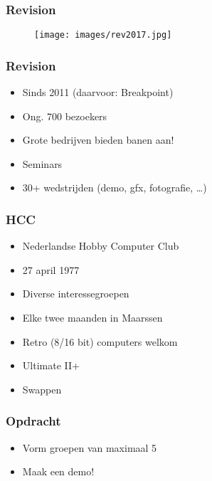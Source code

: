 \documentclass[aspectratio=43]{uva-inf-presentation}
\begin{document}
\begin{frame}
\frametitle{Revision}

\begin{figure}
\texttt{[image: images/rev2017.jpg]}
\end{figure}

\end{frame}


\begin{frame}
\frametitle{Revision}

\begin{itemize}
\item Sinds 2011 (daarvoor: Breakpoint)
\item Ong. 700 bezoekers
\item Grote bedrijven bieden banen aan!
\item Seminars
\item 30+ wedstrijden (demo, gfx, fotografie, \dots)
\end{itemize}

\end{frame}


\begin{frame}
\frametitle{HCC}

\begin{itemize}
\item Nederlandse Hobby Computer Club
\item 27 april 1977
\item Diverse interessegroepen
\item Elke twee maanden in Maarssen
\item Retro (8/16 bit) computers welkom
\item Ultimate II+
\item Swappen
\end{itemize}

\end{frame}


\begin{frame}
\frametitle{Opdracht}

\begin{itemize}
\item Vorm groepen van maximaal 5
\item Maak een demo!
\end{itemize}

\end{frame}
\end{document}
